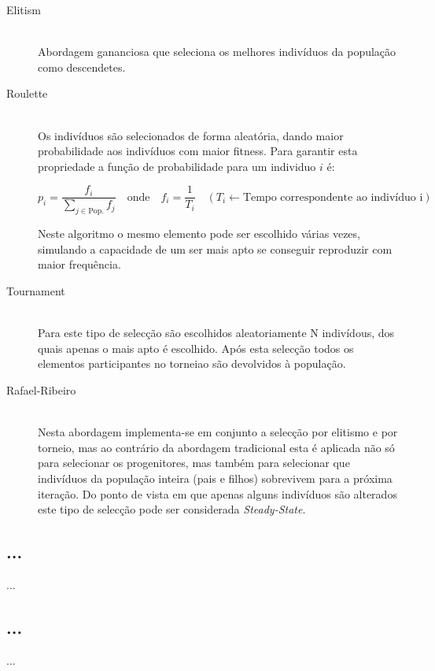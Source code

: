 \documentclass[a4paper]{article}
\begin{document}
\begin{description}
	\item[Elitism] \hfill \\
		Abordagem gananciosa que seleciona os melhores indivíduos da população como descendetes.

	\item[Roulette] \hfill \\
		Os indivíduos são selecionados de forma aleatória, dando maior probabilidade aos indivíduos com maior fitness.
		Para garantir esta propriedade a função de probabilidade para um individuo $i$ é:

		\[
			p_{i} = \frac{f_{i}}{\sum\limits_{j \in \text{Pop.}} f_{j}} \quad \text{onde} \quad f_i = \frac{1}{T_{i}} \quad (T_{i} \leftarrow \text{Tempo correspondente ao indivíduo i})
		\]

		Neste algoritmo o mesmo elemento pode ser escolhido várias vezes,
		simulando a capacidade de um ser mais apto se conseguir reproduzir com maior frequência.

	\item[Tournament] \hfill \\ 
		Para este tipo de selecção são escolhidos aleatoriamente N indivídous, dos quais apenas o mais apto é escolhido.
		Após esta selecção todos os elementos participantes no torneiao são devolvidos à população.

	\item[Rafael-Ribeiro] \hfill \\ 
		Nesta abordagem implementa-se em conjunto a selecção por elitismo e por torneio, mas ao contrário da abordagem tradicional
		esta é aplicada não só para selecionar os progenitores, mas também para selecionar que indivíduos da população inteira (pais e filhos)
		sobrevivem para a próxima iteração. Do ponto de vista em que apenas alguns indivíduos são alterados este tipo de selecção pode ser considerada \emph{Steady-State}.

\end{description}

\indent \indent 


\cleardoublepage

\subsection{...}
\indent \indent ...

\subsection{...}
\indent \indent ...
\end{document}
